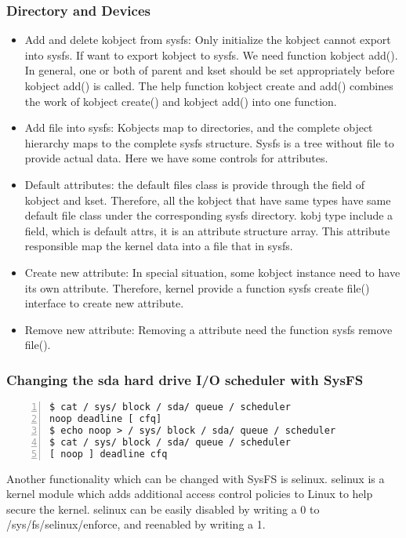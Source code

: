 \documentclass[10pt,draftclsnofoot,journal,compsoc,onecolumn]{IEEEtran}
\begin{document}
\subsubsection{Directory and Devices}
\begin{itemize}
\item Add and delete kobject from sysfs: Only initialize the kobject cannot export into sysfs. If want to export kobject to sysfs. We need function kobject add(). In general, one or both of parent and kset should be set appropriately before kobject add() is called. The help function kobject create and add() combines the work of kobject create() and kobject add() into one function.
\item Add file into sysfs: Kobjects map to directories, and the complete object hierarchy maps to the complete sysfs structure. Sysfs is a tree without file to provide actual data. Here we have some controls for attributes.
\item Default attributes: the default files class is provide through the field of kobject and kset. Therefore, all the kobject that have same types have same default file class under the corresponding sysfs directory. kobj type include a field, which is default attrs, it is an attribute structure array. This attribute responsible map the kernel data into a file that in sysfs.
\item Create new attribute: In special situation, some kobject instance need to have its own attribute. Therefore, kernel provide a function sysfs create file() interface to create new attribute.
\item Remove new attribute: Removing a attribute need the function sysfs remove file().

\end{itemize}

\subsubsection{Changing the sda hard drive I/O scheduler with SysFS}
\begin{lstlisting}[numbers=left]
$ cat / sys/ block / sda/ queue / scheduler
noop deadline [ cfq]
$ echo noop > / sys/ block / sda/ queue / scheduler
$ cat / sys/ block / sda/ queue / scheduler
[ noop ] deadline cfq

\end{lstlisting}

\par Another functionality which can be changed with SysFS is selinux. selinux is a kernel module which adds additional access control policies to Linux to help secure the kernel. selinux can be easily disabled by writing a 0 to /sys/fs/selinux/enforce, and reenabled by writing a 1.
\end{document}
